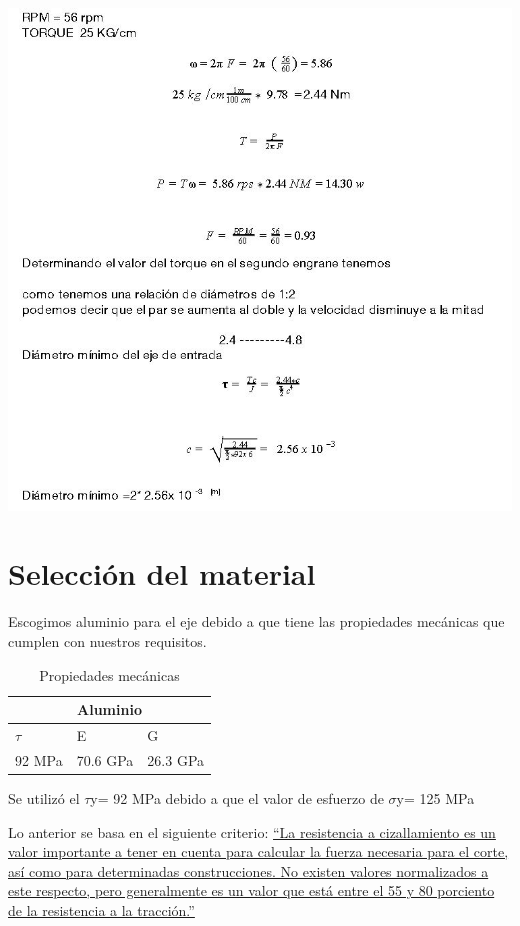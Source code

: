 \begin{center}
\includegraphics[width=0.9\linewidth]{D/figs/DI_3.jpg} 
\end{center}

\section{Selección del material}

 \par
Escogimos aluminio para el eje debido a que tiene las propiedades mecánicas que cumplen con nuestros requisitos. 
\\
\begin{table}[htb]
\centering

\begin{tabular}{| p{2.8cm}| p{2.8cm} | p{2.8cm} |}
\hline
\multicolumn{3}{|c|}{Aluminio} \\
\hline
$\tau$ & E &  G  \\
\hline \hline \hline
92 MPa & 70.6 GPa  & 26.3 GPa \\ \hline
\end{tabular}
\caption{Propiedades mecánicas}
\label{}
\end{table}

\textrm{Se utilizó el $\tau$y= 92 MPa debido a que el valor de esfuerzo de $\sigma$y= 125 MPa}

\textrm{Lo anterior se basa en el siguiente criterio: } \href{http://minisconlatex.blogspot.com/2012/03/guiones-y-comillas.html}{ ``La resistencia a cizallamiento es un valor importante a tener en cuenta para calcular la fuerza necesaria para el corte, así como para determinadas construcciones. No existen valores normalizados a este respecto, pero generalmente es un valor que está entre el 55 y 80 porciento de la resistencia a la tracción.''}

